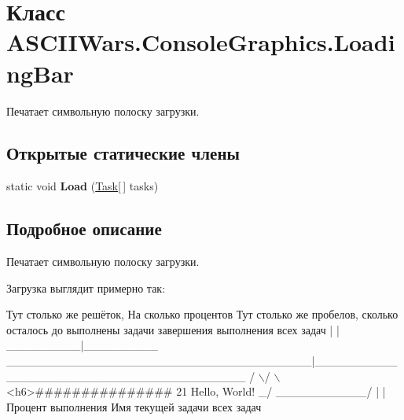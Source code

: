 \hypertarget{class_a_s_c_i_i_wars_1_1_console_graphics_1_1_loading_bar}{}\section{Класс A\+S\+C\+I\+I\+Wars.\+Console\+Graphics.\+Loading\+Bar}
\label{class_a_s_c_i_i_wars_1_1_console_graphics_1_1_loading_bar}


Печатает символьную полоску загрузки.  


\subsection*{Открытые статические члены}
\begin{DoxyCompactItemize}
\item 
\hypertarget{class_a_s_c_i_i_wars_1_1_console_graphics_1_1_loading_bar_a608770219ead82a4ce54ad22f6c3ba38}{}\label{class_a_s_c_i_i_wars_1_1_console_graphics_1_1_loading_bar_a608770219ead82a4ce54ad22f6c3ba38} 
static void {\bfseries Load} (\hyperlink{class_a_s_c_i_i_wars_1_1_console_graphics_1_1_task}{Task}\mbox{[}$\,$\mbox{]} tasks)
\end{DoxyCompactItemize}


\subsection{Подробное описание}
Печатает символьную полоску загрузки. 

Загрузка выглядит примерно так\+: 
\begin{DoxyCode}
 Тут столько же решёток,
 На сколько процентов                 Тут столько же пробелов, сколько осталось до
 выполнены задачи                     завершения выполнения всех задач
          |                                                |
 \_\_\_\_\_\_\_\_\_|\_\_\_\_\_\_\_\_\_  \_\_\_\_\_\_\_\_\_\_\_\_\_\_\_\_\_\_\_\_\_\_\_\_\_\_\_\_\_\_\_\_\_\_\_\_\_|\_\_\_\_\_\_\_\_\_\_\_\_\_\_\_\_\_\_\_\_\_\_\_\_\_\_\_\_\_\_\_\_\_\_\_\_\_\_\_
/                   \(\backslash\)/                                                                             \(\backslash\)
<h6>###############                                                                                21%
Hello, World!                                                                                        \_/
\_\_\_\_\_\_\_\_\_\_\_/                                                                                         |
      |                                                                                      Процент 
      выполнения
Имя текущей задачи                                                                           всех задач
\end{DoxyCode}


